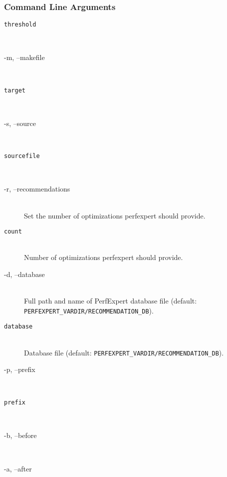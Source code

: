 \subsubsection{Command Line Arguments}


\begin{description}
	\item[\tt threshold]\hfill \\

	\item[\btt -m, --makefile]\hfill \\

	\item[\tt target]\hfill \\

	\item[\btt -s, --source]\hfill \\

	\item[\tt sourcefile]\hfill \\

	\item[\btt -r, --recommendations]\hfill \\
	Set the number of optimizations perfexpert should provide.

	\item[\tt count]\hfill \\
	Number of optimizations perfexpert should provide.

	\item[\btt -d, --database]\hfill \\
	Full path and name of PerfExpert database file (default: \texttt{PERFEXPERT\_VARDIR/RECOMMENDATION\_DB}).

	\item[\tt database]\hfill \\
	Database file (default: \texttt{PERFEXPERT\_VARDIR/RECOMMENDATION\_DB}).

	\item[\btt -p, --prefix]\hfill \\

	\item[\tt prefix]\hfill \\

	\item[\btt -b, --before]\hfill \\

	\item[\btt -a, --after]\hfill \\


\end{description}
